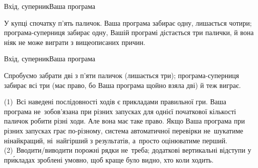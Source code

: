 \noindent\hrulefill

\begin{exampleWidthsAndFileNames}{7em}{7em}{Вхід, суперник}{Ваша програма}
%
\end{exampleWidthsAndFileNames}

У купці спочатку п'ять паличок.
Ваша програма забирає одну, лишається чотири;
програма-суперниця забирає одну, Вашій програмі дістається три палички, й вона ніяк не може виграти з вищеописаних причин.

\noindent\hrulefill

\begin{exampleWidthsAndFileNames}{7em}{7em}{Вхід, суперник}{Ваша програма}
%
\end{exampleWidthsAndFileNames}

Спробуємо забрати дві з п'яти паличок (лишається три); програма-суперниця забирає всі три (має право, бо Ваша програма щойно взяла дві) й теж виграє.

\Notes
(1)~Всі наведені послідовності ходів є прикладами правильної гри.
Ваша програма не~зобов'язана при різних запусках для однієї початкової кількості паличок робити різні ходи. 
Але вона має таке право.
Якщо Ваша програма при різних запусках грає по-різному, 
система автоматичної перевірки не~шукатиме ні\nolinebreak[2] найкращий, ні~найгірший з результатів, а~просто оцінюватиме перший.
(2)~Вводити/виводити порожні рядки не~треба; додаткові вертикальні відступи у пр\'{и}кладах зроблені умовно, щоб краще було видно, хто коли ходить.

